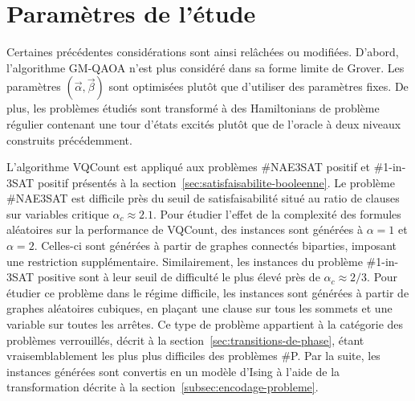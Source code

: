 
\section{Paramètres de l'étude}


Certaines précédentes considérations sont ainsi relâchées ou modifiées. D'abord, l'algorithme GM-QAOA n'est plus considéré dans sa forme limite de Grover. Les paramètres $(\vec{\alpha}, \vec{\beta})$ sont optimisées plutôt que d'utiliser des paramètres fixes. De plus, les problèmes étudiés sont transformé à des Hamiltonians de problème régulier contenant une tour d'états excités plutôt que de l'oracle à deux niveaux construits précédemment.

L'algorithme VQCount est appliqué aux problèmes \#NAE3SAT positif et \#1-in-3SAT positif présentés à la section~\ref{sec:satisfaisabilite-booleenne}. Le problème \#NAE3SAT est difficile près du seuil de satisfaisabilité situé au ratio de clauses sur variables critique $\alpha_{c} \approx 2.1$. Pour étudier l'effet de la complexité des formules aléatoires sur la performance de VQCount, des instances sont générées à $\alpha = 1$ et $\alpha = 2$. Celles-ci sont générées à partir de graphes connectés biparties, imposant une restriction supplémentaire. Similairement, les instances du problème \#1-in-3SAT positive sont à leur seuil de difficulté le plus élevé près de $\alpha_{c} \approx 2/3$. Pour étudier ce problème dans le régime difficile, les instances sont générées à partir de graphes aléatoires cubiques, en plaçant une clause sur tous les sommets et une variable sur toutes les arrêtes. Ce type de problème appartient à la catégorie des problèmes verrouillés, décrit à la section~\ref{sec:transitions-de-phase}, étant vraisemblablement les plus plus difficiles des problèmes \#P. Par la suite, les instances générées sont convertis en un modèle d'Ising à l'aide de la transformation décrite à la section~\ref{subsec:encodage-probleme}.

